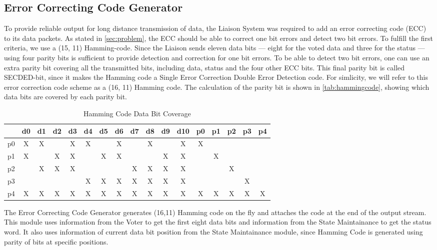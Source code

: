 \subsection{Error Correcting Code Generator}
To provide reliable output for long distance transmission of data, the
Liaison System was required to add an error correcting code (ECC) to
its data packets. As stated in \autoref{sec:problem}, the ECC should
be able to correct one bit errors and detect two bit errors. To
fulfill the first criteria, we use a (15, 11)
Hamming-code\cite{ecc}. Since the Liaison sends eleven data bits ---
eight for the voted data and three for the status --- using four
parity bits is sufficient to provide detection and correction for one
bit errors. To be able to detect two bit errors, one can use an extra
parity bit covering all the transmitted bits, including data, status
and the four other ECC bits. This final parity bit is called
SECDED-bit, since it makes the Hamming code a Single Error Correction
Double Error Detection code\cite{ecc}. For simlicity, we will refer to
this error correction code scheme as a (16, 11) Hamming code. The
calculation of the parity bit is shown in \autoref{tab:hammingcode},
showing which data bits are covered by each parity bit.

\begin{table}[htbp]
  \centering
  \caption{Hamming Code Data Bit Coverage}
  \begin{tabular}{|c|c|c|c|c|c|c|c|c|c|c|c|c|c|c|c|c|}
    \hline
   & d0 & d1 & d2 & d3 & d4 & d5 & d6 & d7 & d8 & d9 & d10 & p0 & p1 & p2 & p3 & p4 \\ \hline
p0 & X  & X  &    & X  & X  &    & X  &    & X  &    & X   & X  &    &    &    &    \\ \hline
p1 & X  &    & X  & X  &    & X  & X  &    &    & X  & X   &    & X  &    &    &    \\ \hline
p2 &    & X  & X  & X  &    &    &    & X  & X  & X  & X   &    &    & X  &    &    \\ \hline
p3 &    &    &    &    & X  & X  & X  & X  & X  & X  & X   &    &    &    & X  &    \\ \hline
p4 & X  & X  & X  & X  & X  & X  & X  & X  & X  & X  & X   & X  & X  & X  & X  & X  \\ \hline
    
  \end{tabular}
  \label{tab:hammingcode}
\end{table}


The Error Correcting Code Generator generates (16,11) Hamming code on
the fly and attaches the code at the end of the output stream. This
module uses information from the Voter to get the first eight data
bits and information from the State Maintainance to get the status
word. It also uses information of current data bit position from the
State Maintainance module, since Hamming Code is generated using
parity of bits at specific positions\cite{ecc}.


